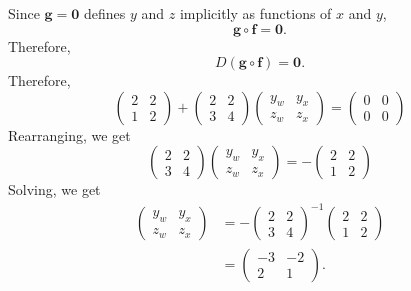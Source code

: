 \documentclass[answers]{exam}
\newcommand{\vf}{\mathbf{f}}
\newcommand{\vg}{\mathbf{g}}
\newcommand{\vzero}{\mathbf{0}}
\begin{document}
\begin{questions}
\begin{solution}
        Since $\vg=\vzero$ defines $y$ and $z$ implicitly as functions of $x$ and $y$,
        \[
            \vg\circ\vf = \vzero.
        \]
        Therefore,
        \[
            D(\vg\circ\vf)=\vzero.
        \]
        Therefore,
        \[
            \begin{pmatrix}
                2&2\\1&2
            \end{pmatrix}+ \begin{pmatrix}
                2&2\\3&4
            \end{pmatrix}\begin{pmatrix}
                y_w&y_x\\z_w&z_x
            \end{pmatrix}=\begin{pmatrix}
                0&0\\0&0
            \end{pmatrix}
        \]
        Rearranging, we get
        \[
            \begin{pmatrix}
                2&2\\3&4
            \end{pmatrix}\begin{pmatrix}
                y_w&y_x\\z_w&z_x
            \end{pmatrix}= -\begin{pmatrix}
                2&2\\1&2
            \end{pmatrix}
        \]
        Solving, we get
        \begin{align*}
            \begin{pmatrix}
                y_w&y_x\\z_w&z_x
            \end{pmatrix}&=- \begin{pmatrix}
                2&2\\3&4
            \end{pmatrix}^{-1}\begin{pmatrix}
                2&2\\1&2
            \end{pmatrix}\\
            &= \begin{pmatrix}
                -3&-2\\2&1
            \end{pmatrix}.
        \end{align*}
    \end{solution}
    

\end{questions}
\end{document}
